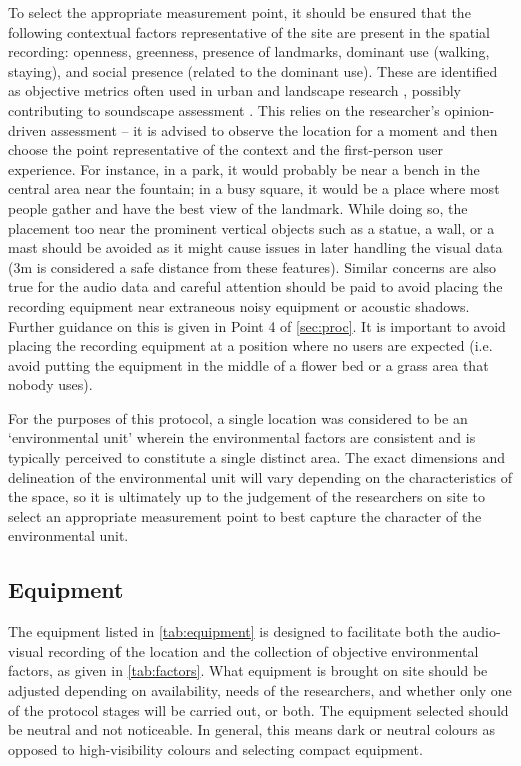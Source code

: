    To select the appropriate measurement point, it should be ensured that the following contextual factors representative of the site are present in the spatial recording: openness, greenness, presence of landmarks, dominant use (walking, staying), and social presence (related to the dominant use). These are identified as objective metrics often used in urban and landscape research \citep{Lynch1964,Kaplan1989,Ewing2013,Quercia2014Aesthetic,Joglekar2020Facelift}, possibly contributing to soundscape assessment \citep{Aletta2019Exploring,Pheasant2010importance}. This relies on the researcher's opinion-driven assessment -- it is advised to observe the location for a moment and then choose the point representative of the context and the first-person user experience. For instance, in a park, it would probably be near a bench in the central area near the fountain; in a busy square, it would be a place where most people gather and have the best view of the landmark. While doing so, the placement too near the prominent vertical objects such as a statue, a wall, or a mast should be avoided as it might cause issues in later handling the visual data (3m is considered a safe distance from these features). Similar concerns are also true for the audio data and careful attention should be paid to avoid placing the recording equipment near extraneous noisy equipment or acoustic shadows. Further guidance on this is given in Point 4 of \cref{sec:proc}. It is important to avoid placing the recording equipment at a position where no users are expected (i.e. avoid putting the equipment in the middle of a flower bed or a grass area that nobody uses).

   For the purposes of this protocol, a single location was considered to be an `environmental unit' wherein the environmental factors are consistent and is typically perceived to constitute a single distinct area. The exact dimensions and delineation of the environmental unit will vary depending on the characteristics of the space, so it is ultimately up to the judgement of the researchers on site to select an appropriate measurement point to best capture the character of the environmental unit.

 \subsection{Equipment}
   \label{sec:equipment}
   The equipment listed in \cref{tab:equipment} is designed to facilitate both the audio-visual recording of the location and the collection of objective environmental factors, as given in \cref{tab:factors}. What equipment is brought on site should be adjusted depending on availability, needs of the researchers, and whether only one of the protocol stages will be carried out, or both. The equipment selected should be neutral and not noticeable. In general, this means dark or neutral colours as opposed to high-visibility colours and selecting compact equipment.

